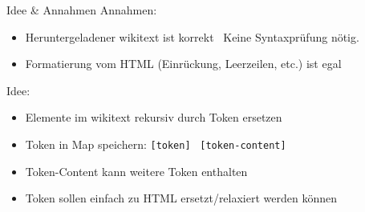 \documentclass[9pt]{beamer}
\begin{document}
	\begin{frame}{Idee \& Annahmen}
		Annahmen:
		\begin{itemize}
			\item Heruntergeladener wikitext ist korrekt \textrightarrow\ Keine Syntaxprüfung nötig.
			\item Formatierung vom HTML (Einrückung, Leerzeilen, etc.) ist egal
		\end{itemize}\pause
		Idee:
		\begin{itemize}
			\item Elemente im wikitext rekursiv durch Token ersetzen
			\item Token in Map speichern: \texttt{[token]} \textrightarrow\ \texttt{[token-content]}
			\item Token-Content kann weitere Token enthalten
			\item Token sollen einfach zu HTML ersetzt/relaxiert werden können
		\end{itemize}
	\end{frame}
	
\end{document}
